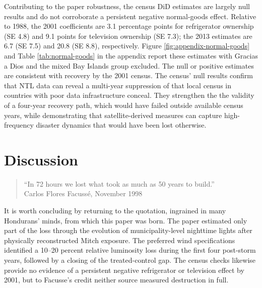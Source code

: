\documentclass[12pt]{article}
\begin{document}
Contributing to the paper robustness, the census DiD estimates are largely null results and do not corroborate a persistent negative normal-goods effect. Relative to 1988, the 2001 coefficients are 3.1 percentage points for refrigerator ownership (SE 4.8) and 9.1 points for television ownership (SE 7.3); the 2013 estimates are 6.7 (SE 7.5) and 20.8 (SE 8.8), respectively. Figure \ref{fig:appendix-normal-goods} and Table \ref{tab:normal-goods} in the appendix report these estimates with Gracias a Dios and the mixed Bay Islands group excluded. The null or positive estimates are consistent with recovery by the 2001 census. The census' null results confirm that NTL data can reveal a multi-year suppression of that local census in countries with poor data infrastructure conceal. They strengthen the the validity of a four-year recovery path, which would have failed outside available census years, while demonstrating that satellite-derived measures can capture high-frequency disaster dynamics that would have been lost otherwise.

\clearpage
\section{Discussion}
\begin{quote}
\centering
``In 72 hours we lost what took as much as 50 years to build.''\\
\hfill Carlos Flores Facussé, November 1998 \parencite{collier1998mitch}
\end{quote}
It is worth concluding by returning to the quotation, ingrained in many Hondurans' minds, from which this paper was born. The paper estimated only part of the loss through the evolution of municipality-level nighttime lights after physically reconstructed Mitch exposure. The preferred wind specifications identified a 10--20 percent relative luminosity loss during the first four post-storm years, followed by a closing of the treated-control gap. The census checks likewise provide no evidence of a persistent negative refrigerator or television effect by 2001, but to Facusse's credit neither source measured destruction in full.
\end{document}
